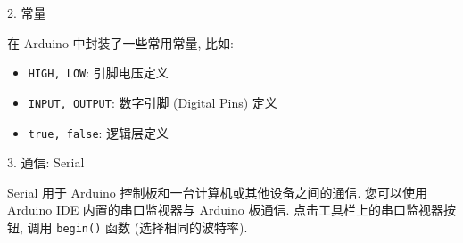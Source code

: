 \documentclass[openany, fontset=windowsold]{ctexbook}
\theoremstyle{kaiti}
\theoremstyle{normal}
\begin{document}
2. 常量

在 Arduino 中封装了一些常用常量, 比如:

\begin{itemize}
  \item \verb|HIGH, LOW|: 引脚电压定义

  \item \verb|INPUT, OUTPUT|: 数字引脚 (Digital Pins) 定义

  \item \verb|true, false|: 逻辑层定义
\end{itemize}

3. 通信: Serial

Serial 用于 Arduino 控制板和一台计算机或其他设备之间的通信. 您可以使用 Arduino IDE 内置的串口监视器与 Arduino 板通信. 点击工具栏上的串口监视器按钮, 调用 \verb|begin()| 函数 (选择相同的波特率).
\end{document}
